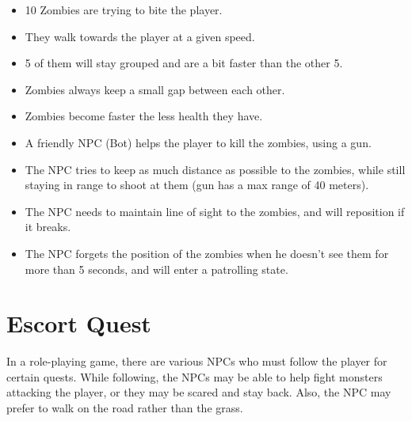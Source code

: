 \begin{itemize}
    \item 10 Zombies are trying to bite the player.
    \item They walk towards the player at a given speed.
    \item 5 of them will stay grouped and are a bit faster than the other 5.
    \item Zombies always keep a small gap between each other.
    \item Zombies become faster the less health they have.
    \item A friendly NPC (Bot) helps the player to kill the zombies, using a gun.
    \item The NPC tries to keep as much distance as possible to the zombies, while still staying in range to shoot at them (gun has a max range of 40 meters).
    \item The NPC needs to maintain line of sight to the zombies, and will reposition if it breaks.
    \item The NPC forgets the position of the zombies when he doesn't see them for more than 5 seconds, and will enter a patrolling state.
\end{itemize}

\section{Escort Quest}

In a role-playing game, there are various NPCs who must follow the player for certain quests. While following, the NPCs may be able to help fight monsters attacking the player, or they may be scared and stay back. Also, the NPC may prefer to walk on the road rather than the grass.

